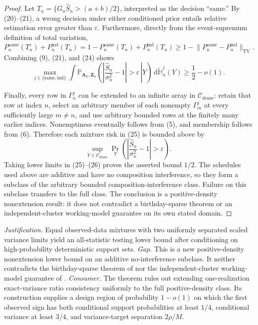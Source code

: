 \documentclass{article}
\begin{document}
\begin{proof}
Let \(T_n=\{G_n\widehat S_n>(a+b)/2\}\), interpreted as the decision ``same.'' By (20)--(21), a wrong decision under either conditioned prior entails relative estimation error greater than \(\varepsilon\). Furthermore, directly from the event-supremum definition of total variation,
\[
P_n^{\mathrm{same}}(T_n^c)+P_n^{\mathrm{ind}}(T_n)
=1-P_n^{\mathrm{same}}(T_n)+P_n^{\mathrm{ind}}(T_n)
\ge1-\lVert P_n^{\mathrm{same}}-P_n^{\mathrm{ind}}\rVert_{\mathrm{TV}}.
\tag{24}
\]
Combining (9), (21), and (24) shows
\[
\max_{j\in\{\mathrm{same},\mathrm{ind}\}}
\int
\mathbb P_{\mathbf A_n,\mathbf Z_n}\!\left(
\left.\left|\frac{\widehat S_n}{\sigma_n^2}-1\right|>\varepsilon
\,\right|Y\right)
\,\mathrm d\widetilde{\mathbb H}_n^j(Y)
\ge\frac12-o(1).
\tag{25}
\]

Finally, every row in \(\Gamma_n^j\) can be extended to an infinite array in \(\mathcal C_{\mathrm{dense}}\): retain that row at index \(n\), select an arbitrary member of each nonempty \(\Gamma_m^j\) at every sufficiently large \(m\ne n\), and use arbitrary bounded rows at the finitely many earlier indices. Nonemptiness eventually follows from (5), and membership follows from (6). Therefore each mixture risk in (25) is bounded above by
\[
\sup_{Y\in\mathcal C_{\mathrm{dense}}}
\Pr_Y\left(\left|\frac{\widehat S_n}{\sigma_n^2}-1\right|>\varepsilon\right).
\tag{26}
\]
Taking lower limits in (25)--(26) proves the asserted bound \(1/2\). The schedules used above are additive and have no composition interference, so they form a subclass of the arbitrary bounded composition-interference class. Failure on this subclass transfers to the full class. The conclusion is a positive-density nonextension result: it does not contradict a birthday-sparse theorem or an independent-cluster working-model guarantee on its own stated domain.
\end{proof}
\par\smallskip\noindent \textit{Justification.} Equal observed-data mixtures with two uniformly separated scaled variance limits yield an all-statistic testing lower bound after conditioning on high-probability deterministic support sets. \textit{Gap.} This is a new positive-density nonextension lower bound on an additive no-interference subclass. It neither contradicts the birthday-sparse theorem of \cite{FuSamiiWang2026} nor the independent-cluster working-model guarantee of \cite{PustejovskyTipton2018}. \textit{Consumer.} The theorem rules out extending one-realization exact-variance ratio consistency uniformly to the full positive-density class. Its construction supplies a design region of probability \(1-o(1)\) on which the first observed sign has both conditional support probabilities at least \(1/4\), conditional variance at least \(3/4\), and variance-target separation \(2\rho/M\).
\end{document}
